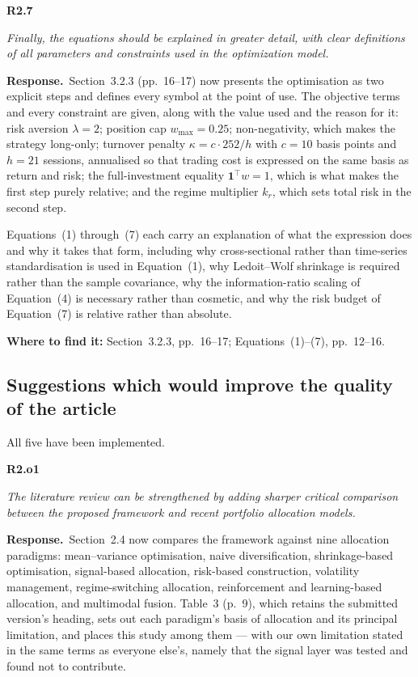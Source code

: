 \documentclass[11pt,a4paper]{article}
\newcommand{\rc}[2]{%
  \par\medskip\noindent
  \colorbox{qbg}{\parbox{\dimexpr\linewidth-2\fboxsep}{%
  \textbf{#1}\par\smallskip\itshape #2}}\par\nopagebreak}
\newcommand{\resp}{\par\medskip\noindent\textbf{Response.}\ }
\newcommand{\where}[1]{\par\smallskip\noindent\textcolor{blue!55!black}{\textbf{Where to find it:} #1}\par}
\begin{document}
\rc{R2.7}{Finally, the equations should be explained in greater detail, with clear
definitions of all parameters and constraints used in the optimization model.}

\resp Section~3.2.3 (pp.~16--17) now presents the optimisation as two explicit steps and
defines every symbol at the point of use. The objective terms and every constraint are
given, along with the value used and the reason for it: risk aversion $\lambda = 2$;
position cap $w_{\max} = 0.25$; non-negativity, which makes the strategy long-only;
turnover penalty $\kappa = c \cdot 252 / h$ with $c = 10$ basis points and $h = 21$
sessions, annualised so that trading cost is expressed on the same basis as return and
risk; the full-investment equality $\mathbf{1}^{\top} w = 1$, which is what makes the first
step purely relative; and the regime multiplier $k_r$, which sets total risk in the second
step.

Equations~(1) through~(7) each carry an explanation of what the expression does and why it
takes that form, including why cross-sectional rather than time-series standardisation is
used in Equation~(1), why Ledoit--Wolf shrinkage is required rather than the sample
covariance, why the information-ratio scaling of Equation~(4) is necessary rather than
cosmetic, and why the risk budget of Equation~(7) is relative rather than absolute.
\where{Section~3.2.3, pp.~16--17; Equations~(1)--(7), pp.~12--16.}

\subsection*{Suggestions which would improve the quality of the article}

All five have been implemented.

\rc{R2.o1}{The literature review can be strengthened by adding sharper critical comparison
between the proposed framework and recent portfolio allocation models.}

\resp Section~2.4 now compares the framework against nine allocation paradigms:
mean--variance optimisation, naive diversification, shrinkage-based optimisation,
signal-based allocation, risk-based construction, volatility management, regime-switching
allocation, reinforcement and learning-based allocation, and multimodal fusion. Table~3
(p.~9), which retains the submitted version's heading, sets out each paradigm's basis of
allocation and its principal limitation, and places this study among them --- with our own
limitation stated in the same terms as everyone else's, namely that the signal layer was
tested and found not to contribute.
\end{document}
